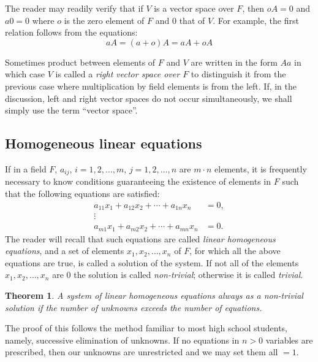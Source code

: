 \documentclass[10pt,leqno]{article}
\newtheorem{theo}{Theorem}
\theoremstyle{definition}
\begin{document}
The reader may readily verify that if $V$ is a vector space over $F$, then $oA = 0$ and $a0 = 0$ where $o$ is the zero element of $F$ and $0$ that of $V$.
For example, the first relation follows from the equations:
\[
aA = (a + o)A = aA + oA
\]

Sometimes product between elements of $F$ and $V$ are written in the form $Aa$ in which case $V$ is called a \emph{right vector space over $F$} to distinguish it from the previous case where multiplication by field elements is from the left.
If, in the discussion, left and right vector spaces do not occur simultaneously, we shall simply use the term ``vector space''.


\subsection{Homogeneous linear equations}

If in a field $F$, $a_{ij}$, $i = 1,2,\ldots,m$, $j = 1,2,\ldots,n$ are $m \cdot n$ elements, it is frequently necessary to know conditions guaranteeing the existence of elements in $F$ such that the following equations are satisfied:
\begin{equation}
\label{eq:on}
\begin{aligned}
a_{11} x_1 + a_{12} x_2 + \cdots + a_{1n} x_n &= 0,
\\
\vdots &
\\
a_{m1} x_1 + a_{m2} x_2 + \cdots + a_{mn} x_n &= 0.
\end{aligned}
\end{equation}
The reader will recall that such equations are called \emph{linear homogeneous equations}, and a set of elements $x_1, x_2, \ldots, x_n$ of $F$, for which all the above equations are true, is called a solution of the system.
If not all of the elements $x_1, x_2, \ldots, x_n$ are $0$ the solution is called \emph{non-trivial}; otherwise it is called \emph{trivial}.


\begin{theo}
\label{theo:on}
A system of linear homogeneous equations always as a non-trivial solution if the number of unknowns exceeds the number of equations.
\end{theo}


The proof of this follows the method familiar to most high school students, namely, successive elimination of unknowns.
If no equations in $n > 0$ variables are prescribed, then our unknowns are unrestricted and we may set them all $= 1$.
\end{document}
